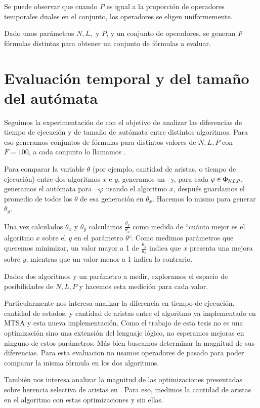 Se puede observar que cuando $P$ es igual a la proporción de operadores temporales duales en el conjunto, los operadores se eligen uniformemente.

Dado unos parámetros $N, L,$ y $P$, y un conjunto de operadores, se generan $F$ fórmulas distintas para obtener un conjunto de fórmulas a evaluar.

\section{Evaluación temporal y del tamaño del autómata}

Seguimos la experimentación de \citet{randomBenchmark} con el objetivo de analizar las diferencias de tiempo de ejecución y de tamaño de autómata entre distintos algoritmos. Para eso generamos conjuntos de fórmulas para distintos valores de $N,L,P$ con $F=100$, a cada conjunto lo llamamos \conj.

Para comparar la variable $\theta$ (por ejemplo, cantidad de aristas, o tiempo de ejecución) entre dos algoritmos $x$ e $y$, generamos un \conj \ y, para cada $\varphi \in \Phi_{N,L,P}$, generamos el autómata para $\neg\varphi$ usando el algoritmo $x$, después guardamos el promedio de todos los $\theta$ de esa generación en $\theta_x$. Hacemos lo mismo para generar $\theta_y$.

Una vez calculados $\theta_x$ y $\theta_y$ calculamos $\frac{\theta_y}{\theta_x}$ como medida de ``cuánto mejor es el algoritmo $x$ sobre el $y$ en el parámetro $\theta$``. Como medimos parámetros que queremos minimizar, un valor mayor a 1 de $\frac{\theta_y}{\theta_x}$ indica que $x$ presenta una mejora sobre $y$, mientras que un valor menor a 1 indica lo contrario.

Dados dos algoritmos y un parámetro a medir, exploramos el espacio de posibilidades de $N,L,P$ y hacemos esta medición para cada valor.

Particularmente nos interesa analizar la diferencia en tiempo de ejecución, cantidad de estados, y cantidad de aristas entre el algoritmo ya implementado en MTSA y esta nueva implementación. Como el trabajo de esta tesis no es una optimización sino una extensión del lenguaje lógico, no esperamos mejoras en ninguno de estos parámetros. Más bien buscamos determinar la magnitud de sus diferencias. Para esta evaluacion no usamos operadores de pasado para poder comparar la misma fórmula en los dos algoritmos.

También nos interesa analizar la magnitud de las optimizaciones presentadas sobre herencia selectiva de aristas en \citet{pnueli93}. Para eso, medimos la cantidad de aristas en el algoritmo con estas optimizaciones y sin ellas. 

